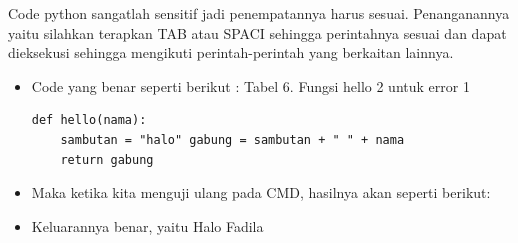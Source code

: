 Code python sangatlah sensitif jadi penempatannya harus sesuai. Penanganannya yaitu silahkan terapkan TAB atau SPACI sehingga perintahnya sesuai dan dapat dieksekusi sehingga mengikuti perintah-perintah yang berkaitan lainnya.
\begin{itemize}
\item Code yang benar seperti berikut : 
Tabel 6. Fungsi hello 2 untuk error 1  
\begin{verbatim}
def hello(nama): 
	sambutan = "halo" gabung = sambutan + " " + nama 
 	return gabung 
\end{verbatim}
\item Maka ketika kita menguji ulang pada CMD, hasilnya akan seperti berikut: 
\item Keluarannya benar, yaitu Halo Fadila 
\end{itemize}

